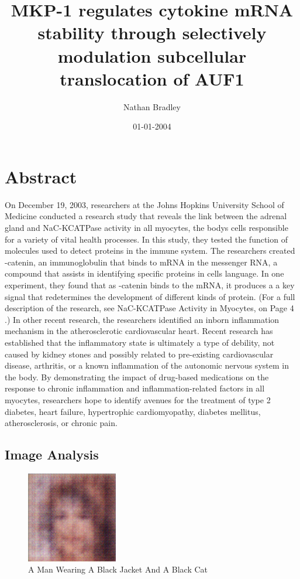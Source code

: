 \documentclass{article}%
\title{MKP{-}1 regulates cytokine mRNA stability through selectively modulation subcellular translocation of AUF1}%
\author{Nathan Bradley}%
\affil{Nephrology Unit, Department of Medicine, Faculty of Medicine, Thammasat University (Rangsit Campus), Khlong Nueng, Khlong Luang, Pathum Thani 12121, Thailand}%
\date{01{-}01{-}2004}%
\begin{document}
%
\normalsize%
\maketitle%
\section{Abstract}%
\label{sec:Abstract}%
On December 19, 2003, researchers at the Johns Hopkins University School of Medicine conducted a research study that reveals the link between the adrenal gland and NaC{-}KCATPase activity in all myocytes, the bodys cells responsible for a variety of vital health processes. In this study, they tested the function of molecules used to detect proteins in the immune system.\newline%
The researchers created {-}catenin, an immunoglobulin that binds to mRNA in the messenger RNA, a compound that assists in identifying specific proteins in cells language. In one experiment, they found that as {-}catenin binds to the mRNA, it produces a a key signal that redetermines the development of different kinds of protein. (For a full description of the research, see NaC{-}KCATPase Activity in Myocytes, on Page 4 .)\newline%
In other recent research, the researchers identified an inborn inflammation mechanism in the atherosclerotic cardiovascular heart. Recent research has established that the inflammatory state is ultimately a type of debility, not caused by kidney stones and possibly related to pre{-}existing cardiovascular disease, arthritis, or a known inflammation of the autonomic nervous system in the body.\newline%
By demonstrating the impact of drug{-}based medications on the response to chronic inflammation and inflammation{-}related factors in all myocytes, researchers hope to identify avenues for the treatment of type 2 diabetes, heart failure, hypertrophic cardiomyopathy, diabetes mellitus, atherosclerosis, or chronic pain.

%
\subsection{Image Analysis}%
\label{subsec:ImageAnalysis}%


\begin{figure}[h!]%
\centering%
\includegraphics[width=150px]{500_fake_images/samples_5_426.png}%
\caption{A Man Wearing A Black Jacket And A Black Cat}%
\end{figure}

%
\end{document}
